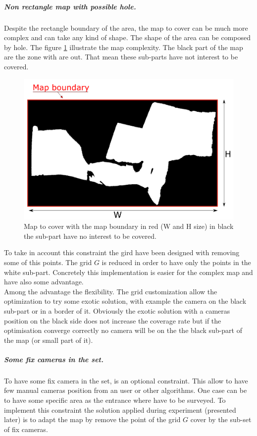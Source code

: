  \subparagraph{Non rectangle map with possible hole.}
Despite the rectangle boundary of the area, the map to cover can be much more complex and can take any kind of shape. The shape of the area can be composed by hole. The figure \ref{fig:boundaryMap} illustrate the map complexity. The black part of the map are the zone with are out. That mean these sub-parts have not interest to be covered.
 \begin{figure}[t!]
   \includegraphics[width=\linewidth]{img/BoundaryMap2.png}
  \caption{Map to cover with the map boundary in red (W and H size) in black the sub-part have no interest to  be covered.   
}\label{fig:boundaryMap}
  \endminipage\hfill
\end{figure}
To take in account this constraint the gird have been designed with removing some of this points.
The grid $G$ is reduced in order to have only the points in the white sub-part. 
Concretely this implementation is easier for the complex map and have also some advantage. \\
Among the advantage the flexibility. The grid customization  allow the optimization to try some exotic solution, with example the camera on the black sub-part or  in a border of it.  Obviously  the exotic solution with a cameras position on the black side does not increase the coverage rate  but if the optimisation converge correctly no camera will be on the the black sub-part of the map (or small part of it).\\

\subparagraph{Some fix cameras in the set.}
To have some fix camera in the set, is an optional constraint. This allow to have few manual cameras position from an user or other algorithms.
One case can be to have some specific area as the entrance where have to be surveyed.  
To implement this constraint the solution applied during experiment (presented later) is to adapt the map by remove the point of the grid $G$ cover by the sub-set of fix cameras.\\

